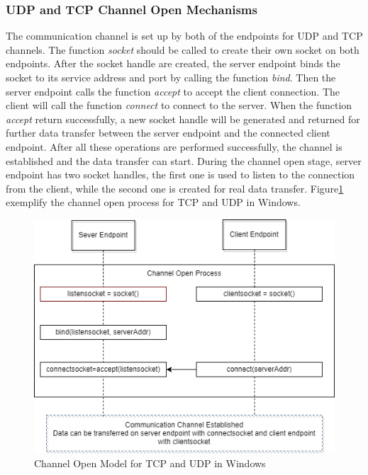 \subsubsection{UDP and TCP Channel Open Mechanisms} 
The communication channel is set up by both of the endpoints for UDP and TCP channels. The function \textit{socket} should be called to create their own socket on both endpoints. After the socket handle are created, the server endpoint binds the socket to its service address and port by calling the function \textit{bind}. Then the server endpoint calls the function  \textit{accept} to accept the client connection. The client will call the function \textit{connect} to connect to the server. When the function \textit{accept} return successfully, a new socket handle will be generated and returned for further data transfer between the server endpoint and  the connected client endpoint. After all these operations are performed successfully, the channel is established and the data transfer can start. During the channel open stage, server endpoint has two socket handles, the first one is used to listen to the connection from the client, while the second one is created for real data transfer. Figure\ref{channelopen2} exemplify the channel open process for TCP and UDP  in Windows.
    
\begin{figure}[H]
\centerline{\includegraphics[scale=0.55]{Figures/tcpudpchannelopen}}
 \caption{Channel Open Model for TCP and UDP in Windows}
\label{channelopen2}    
\end{figure}

